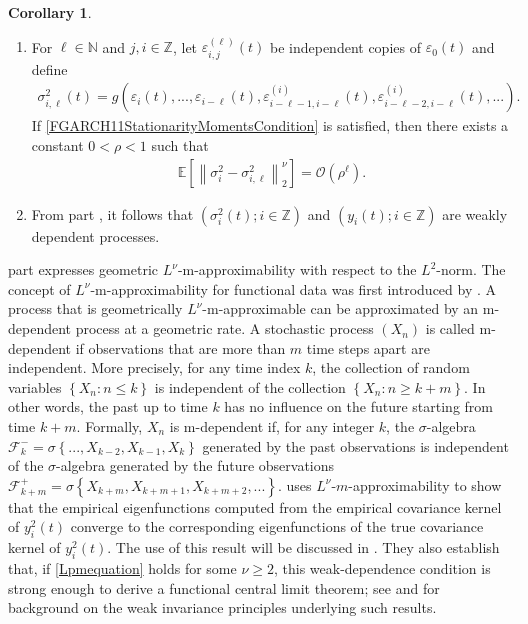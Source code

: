 \documentclass[12pt,a4paper]{article}
\theoremstyle{definition}
\newtheorem{corollary}{Corollary}[section]
\begin{document}
\begin{corollary}
\label{SecondCorollaryModelSection}
    \begin{enumerate}[label=(\Roman*)]
        \item
        \label{FGARCH11CLTCondition}
        For $\ell\in \mathbb{N}$ and $j,i\in\mathbb{Z}$, let $\varepsilon_{i,j}^{(\ell)}(t)$ be independent copies of $\varepsilon_0(t)$ and define
        \begin{gather}
            \sigma_{i,\ell}^2(t) = g\left(\varepsilon_i(t),...,\varepsilon_{i-\ell}(t),\varepsilon_{i-\ell-1,i-\ell}^{(i)}(t),\varepsilon_{i-\ell-2,i-\ell}^{(i)}(t),... \right).
        \end{gather}
        If \cref{FGARCH11StationarityMomentsCondition} is satisfied, then there exists a constant $0<\rho<1$ such that
        \begin{gather}
        \label{Lpmequation}
            \mathbb{E}\left[\left\|\sigma_i^2-\sigma_{i,\ell}^2 \right\|_2^\nu\right]=\mathcal{O}(\rho^\ell).
        \end{gather}
        \item From part , it follows that $(\sigma_i^2(t);i\in\mathbb{Z})$ and $(y_i(t);i\in \mathbb{Z})$ are weakly dependent processes.
    \end{enumerate}
\end{corollary}
 part  expresses geometric $L^\nu$-m-approximability with respect to the $L^2$-norm. The concept of $L^\nu$-m-approximability for functional data was first introduced by \citet{Lpmapproxibility}. A process that is geometrically $L^\nu$-m-approximable can be approximated by an m-dependent process at a geometric rate. A stochastic process $(X_n)$ is called m-dependent if observations that are more than $m$ time steps apart are independent. More precisely, for any time index $k$, the collection of random variables $\left\{X_n:n\leq k \right\}$ is independent of the collection $\left\{X_n:n\geq k+m \right\}$. In other words, the past up to time $k$ has no influence on the future starting from time $k+m$. Formally, $X_n$ is m-dependent if, for any integer $k$, the $\sigma$-algebra $\mathcal{F}_k^-=\sigma\left\{...,X_{k-2},X_{k-1},X_k \right\}$ generated by the past observations is independent of the $\sigma$-algebra generated by the future observations $\mathcal{F}_{k+m}^+=\sigma\left\{ X_{k+m},X_{k+m+1},X_{k+m+2},... \right\}$. \citet{Aue2017} uses $L^\nu$-$m$-approximability to show that the empirical eigenfunctions computed from the empirical covariance kernel of $y_i^2(t)$ converge to the corresponding eigenfunctions of the true covariance kernel of $y_i^2(t)$. The use of this result will be discussed in . They also establish that, if \cref{Lpmequation} holds for some $\nu \geq 2$, this weak-dependence condition is strong enough to derive a functional central limit theorem; see \citet{BERKES2013385} and \citet{Jirak2013} for background on the weak invariance principles underlying such results.
\end{document}
